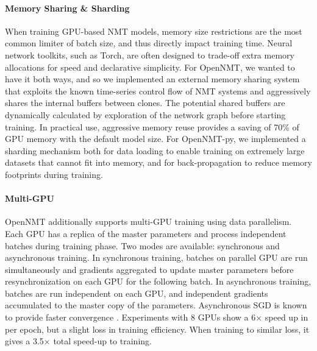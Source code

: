 \documentclass[]{article}
\begin{document}
\paragraph{Memory Sharing \& Sharding}

When training GPU-based NMT models, memory size restrictions are the
most common limiter of batch size, and thus directly impact training
time. Neural network toolkits, such as Torch, are often designed to
trade-off extra memory allocations for speed and declarative
simplicity. For OpenNMT, we wanted to have it both ways, and so we
implemented an external memory sharing system that exploits the known
time-series control flow of NMT systems and aggressively shares the
internal buffers between clones. The potential shared buffers are
dynamically calculated by exploration of the network graph before
starting training. In practical use, aggressive memory reuse provides
a saving of 70\% of GPU memory with the default model size. For OpenNMT-py, we implemented a sharding mechanism both for data loading to enable training on extremely large datasets that cannot fit into memory, and for back-propagation to reduce memory footprints during training.

\paragraph{Multi-GPU} OpenNMT additionally supports multi-GPU training
using data parallelism. Each GPU has a replica of the master
parameters and process independent batches during training phase.  Two
modes are available: synchronous and asynchronous training.  In
synchronous training, batches on parallel GPU are run simultaneously
and gradients aggregated to update master parameters before
resynchronization on each GPU for the following batch.  In
asynchronous training, batches are run independent on each GPU, and
independent gradients accumulated to the master copy of the
parameters. Asynchronous SGD is known to provide faster convergence
\citep{dean2012large}. Experiments with 8 GPUs show a 6$\times$ speed up in 
per epoch, but a slight loss in training efficiency. When training to similar
loss, it gives a 3.5$\times$ total speed-up to training.
\end{document}

